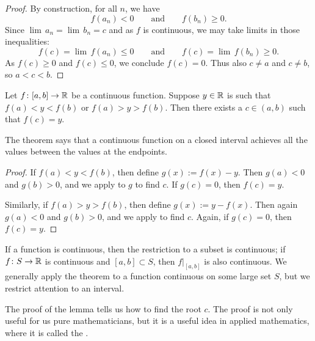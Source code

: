 \begin{proof}
By construction, for all $n$, we have
\begin{equation*}
f(a_n) < 0
\qquad \text{and} \qquad
f(b_n) \geq 0 .
\end{equation*}
Since
$\lim\, a_n = \lim\, b_n = c$
and as $f$ is continuous, we may take 
limits in those inequalities:
\begin{equation*}
f(c) = \lim\, f(a_n) \leq 0
\qquad \text{and} \qquad
f(c) = \lim\, f(b_n) \geq 0 .
\end{equation*}
As $f(c) \geq 0$ and 
$f(c) \leq 0$, we conclude $f(c) = 0$.
Thus also $c \not=a$ and $c \not= b$, so
$a < c < b$.
\end{proof}

\begin{thm} \label{IVT:thm}
Let $f \colon [a,b] \to {\mathbb{R}}$ be a continuous function.
Suppose $y \in {\mathbb{R}}$ is such that $f(a) < y < f(b)$
or $f(a) > y > f(b)$.  Then there exists a $c \in (a,b)$
such that $f(c) = y$.
\end{thm}

The theorem says that a continuous function on a closed interval
achieves all the values between the values at the endpoints.

\begin{proof}
If $f(a) < y < f(b)$, then define $g(x) := f(x)-y$.  Then 
$g(a) < 0$ and $g(b) > 0$, and we apply 
to $g$ to find $c$.  If $g(c) = 0$, then $f(c) = y$.

Similarly, if $f(a) > y > f(b)$, then define $g(x) := y-f(x)$.  Then
again $g(a) < 0$ and $g(b) > 0$, and we apply  to
find $c$.
Again, if $g(c) = 0$, then $f(c) = y$.
\end{proof}

If a function is continuous, then the restriction
to a subset is continuous; if $f \colon S \to {\mathbb{R}}$ is continuous and
$[a,b] \subset S$, then $f|_{[a,b]}$ is also continuous.  We generally
apply the theorem to a function continuous on some large set $S$,
but we restrict attention to an interval.


The proof of the lemma tells us how to find the root $c$.  The
proof is not only useful for us pure mathematicians,
but it is a useful idea in applied mathematics,
where it is called the \emph{}.


